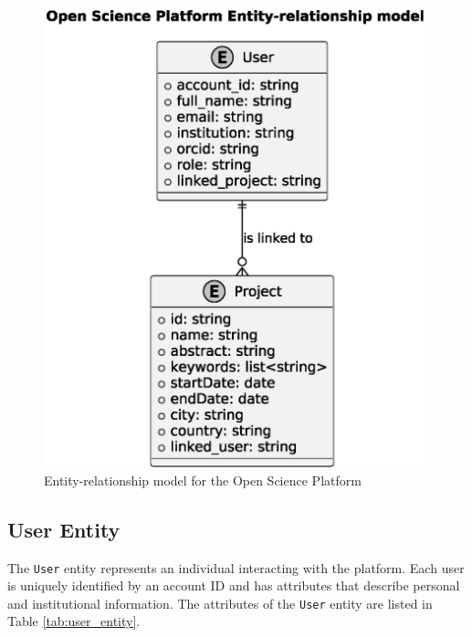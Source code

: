 \documentclass{article}
\begin{document}
\begin{figure}[htbp]
      \centering
      \includegraphics[width=0.98\textwidth, keepaspectratio]{entity_relationship_model.eps}
      \caption{Entity-relationship model for the Open Science Platform}
      \label{fig:er_model}
\end{figure}



\subsection{User Entity}
The \texttt{User} entity represents an individual interacting with the platform. Each user is uniquely identified by an account ID and has attributes that describe personal and institutional information. The attributes of the \texttt{User} entity are listed in Table \ref{tab:user_entity}.
\end{document}
